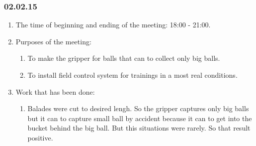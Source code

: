 \subsubsection{02.02.15}
\begin{enumerate}
	
	\item The time of beginning and ending of the meeting: 18:00 - 21:00.
	
	\item Purposes of the meeting: 
	\begin{enumerate}
		
		\item To make the gripper for balls that can to collect only big balls.
		
		\item To install field control system for trainings in a most real conditions.
		
	\end{enumerate}

	\item Work that has been done:
	\begin{enumerate}
		
		\item Balades were cut to desired lengh. So the gripper captures only big balls but it can to capture small ball by accident because it can to get into the bucket behind the big ball. But this situations were rarely. So that result positive.
		

\end{enumerate}
\end{enumerate}
